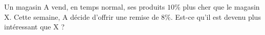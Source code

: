 
\begin{exercice}\label{exoSeconde-0024}

    Un magasin A vend, en temps normal, ses produits \( 10\%\) plus cher que le magasin X. Cette semaine, A décide d'offrir une remise de \( 8\%\). Est-ce qu'il est devenu plus intéressant que X ?

\end{exercice}
